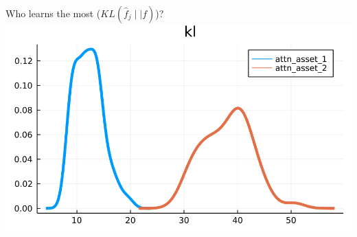 \documentclass[
  ignorenonframetext,
]{beamer}
\begin{document}
\begin{frame}{Who learns the most (\(KL(\hat f_j \mid\mid f)\))?}
\includegraphics[width=0.4\paperheight]{complexity_files/figure-beamer/unnamed-chunk-19-4}
\end{frame}
\end{document}
